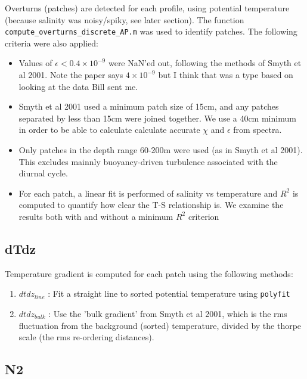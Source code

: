 \documentclass[11pt]{article}
\begin{document}
Overturns (patches) are detected for each profile, using potential temperature (because salinity was noisy/spiky, see later section). The function \verb+compute_overturns_discrete_AP.m+ was used to identify patches. \newline
The following criteria were also applied:
\begin{itemize}
\item Values of $\epsilon <0.4\times 10^{-9}$ were NaN'ed out, following the methods of Smyth et al 2001. Note the paper says $4\times 10^{-9}$ but I think that was a type based on looking at the data Bill sent me.
\item Smyth et al 2001 used a minimum patch size of 15cm, and any patches separated by less than 15cm were joined together.  We use a 40cm minimum in order to be able to calculate calculate accurate $\chi$ and $\epsilon$ from spectra.
\item Only patches in the depth range 60-200m were used (as in Smyth et al 2001). This excludes mainnly buoyancy-driven turbulence associated with the diurnal cycle.
\item For each patch, a linear fit is performed of salinity vs temperature and $R^2$ is computed to quantify how clear the T-S relationship is. We examine the results both with and without a minimum $R^2$ criterion
\end{itemize}


\subsection{dTdz}

Temperature gradient is computed for each patch using the following methods:
\begin{enumerate}
\item $dtdz_{line}$ : Fit a straight line to sorted potential temperature using \verb+polyfit+
\item $dtdz_{bulk}$ : Use the 'bulk gradient' from Smyth et al 2001, which is the rms fluctuation from the background (sorted) temperature, divided by the thorpe scale (the rms re-ordering distances).
\end{enumerate}


\subsection{N2}
\end{document}
